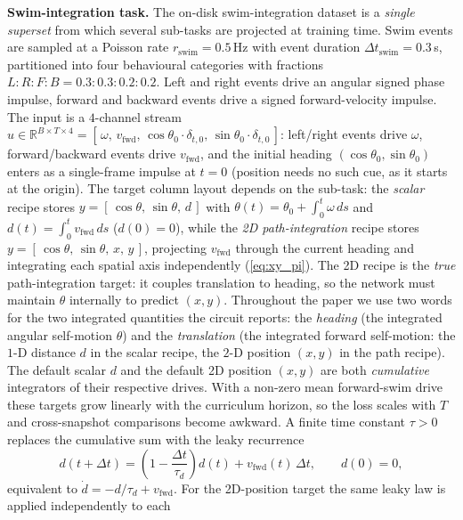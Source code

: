 \documentclass[11pt]{article}
\def\R{\mathbb{R}}
\begin{document}
\bigskip
\noindent\textbf{Swim-integration task.}%
\label{method:swim_task_modes}\label{method:xi_leaky}
The on-disk swim-integration dataset is a \emph{single superset} from
which several sub-tasks are projected at training time. Swim events are
sampled at a Poisson rate $r_{\mathrm{swim}}=0.5\,\mathrm{Hz}$ with
event duration $\Delta t_{\mathrm{swim}}=0.3\,$s, partitioned into four
behavioural categories with fractions $L:R:F:B=0.3:0.3:0.2:0.2$. Left
and right events drive an angular signed phase impulse, forward and
backward events drive a signed forward-velocity impulse. The input is a
$4$-channel stream $u\in\R^{B\times T\times 4}=[\,\omega,\,v_{\mathrm{fwd}},\,
\cos\theta_0\!\cdot\!\delta_{t,0},\,\sin\theta_0\!\cdot\!\delta_{t,0}\,]$:
left/right events drive $\omega$, forward/backward events drive
$v_{\mathrm{fwd}}$, and the initial heading $(\cos\theta_0,\sin\theta_0)$
enters as a single-frame impulse at $t=0$ (position needs no such cue, as it
starts at the origin). The target column layout depends on the sub-task: the
\emph{scalar} recipe stores $y=[\,\cos\theta,\,\sin\theta,\,d\,]$ with
$\theta(t)=\theta_0+\int_0^t\omega\,ds$ and $d(t)=\int_0^t v_{\mathrm{fwd}}\,ds$
($d(0)=0$), while the \emph{2D path-integration} recipe stores
$y=[\,\cos\theta,\,\sin\theta,\,x,\,y\,]$, projecting $v_{\mathrm{fwd}}$ through
the current heading and integrating each spatial axis independently
(\cref{eq:xy_pi}). The 2D recipe is the \emph{true} path-integration target: it
couples translation to heading, so the network must maintain $\theta$
internally to predict $(x,y)$. Throughout the paper we use two words for the
two integrated quantities the circuit reports: the \emph{heading} (the
integrated angular self-motion $\theta$) and the \emph{translation} (the
integrated forward self-motion: the $1$-D distance $d$ in the scalar
recipe, the $2$-D position $(x,y)$ in the path recipe). The default scalar
$d$ and the default 2D position $(x, y)$ are both
\emph{cumulative} integrators of their respective drives. With a non-zero
mean forward-swim drive these targets grow linearly with the
curriculum horizon, so the loss scales with $T$ and cross-snapshot
comparisons become awkward. A finite time constant $\tau>0$ replaces
the cumulative sum with the leaky recurrence
\begin{equation}
d(t+\Delta t) = \left(1-\frac{\Delta t}{\tau_d}\right)d(t)
    + v_{\mathrm{fwd}}(t)\,\Delta t,
\qquad d(0)=0,
\label{eq:xi_leaky}
\end{equation}
equivalent to $\dot d = -d/\tau_d + v_{\mathrm{fwd}}$. For the
2D-position target the same leaky law is applied independently to each
\end{document}
